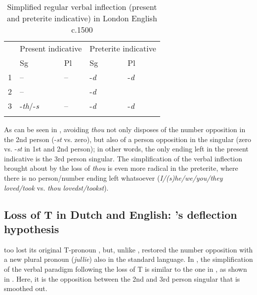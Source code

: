 \documentclass[output=paper,hidelinks]{langscibook}
\begin{document}
\begin{table}
\caption{Simplified regular verbal inflection (present and preterite indicative) in London English c.1500}
\label{tab4elsweiler}
 \begin{tabularx}{.8\textwidth}{X p{1cm}p{1cm}p{1cm}p{1cm}}
  \lsptoprule
            & \multicolumn{2}{l}{Present indicative} & \multicolumn{2}{l}{Preterite indicative}\\\cmidrule(lr){2-3}\cmidrule(lr){4-5}
  	 &   Sg  & Pl	&  Sg	& Pl	\\
  \midrule
  1  &   --  & --   &  -\textit{d}   & -\textit{d}	\\
  2  & \multicolumn{2}{l}{\hspace*{7mm} --} & \multicolumn{2}{l}{\hspace*{7mm} -\textit{d}} \\
  3  &  -\textit{th}/-\textit{s}  & --   &  -\textit{d}   & -\textit{d}	\\
  \lspbottomrule
 \end{tabularx}
\end{table}

As can be seen in , avoiding \textit{thou} not only disposes of the number opposition in the 2nd person (-\textit{st} vs. zero), but also of a person opposition in the singular (zero vs. -\textit{st} in 1st and 2nd person); in other words, the only ending left in the present indicative is the 3rd person singular. The simplification of the verbal inflection brought about by the loss of \textit{thou} is even more radical in the preterite, where there is no person/number ending left whatsoever (\textit{I/(s)he/we/you/they loved/took} vs. \textit{thou lovedst/tookst}).

\subsection{Loss of T in Dutch and English: \citeauthor{Aalberse2015}'s deflection hypothesis}\label{sec:eh:5.2}

 too lost its original T-pronoun \citep[in the early seventeenth century, cf.][222]{Howe1996}, but, unlike , restored the number opposition with a new plural pronoun (\textit{jullie}) also in the standard language. In , the simplification of the verbal paradigm following the loss of T is similar to the one in , as shown in . Here, it is the opposition between the 2nd and 3rd person singular that is smoothed out.
\end{document}
